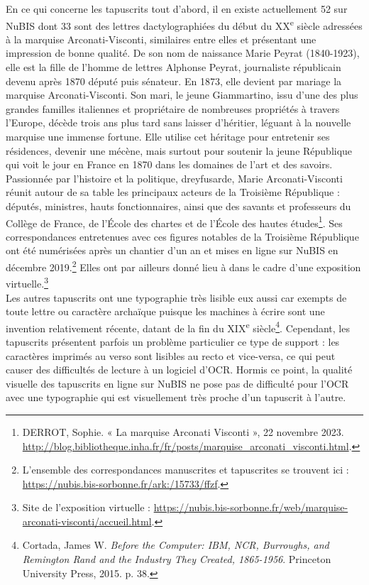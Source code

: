 \documentclass[a4paper,12pt,twoside]{book}
\begin{document}
En ce qui concerne les tapuscrits tout d'abord, il en existe
actuellement 52 sur NuBIS dont 33 sont des lettres dactylographiées du
début du XX\textsuperscript{e} siècle adressées à la marquise
Arconati-Visconti, similaires entre elles et présentant une impression
de bonne qualité. De son nom de naissance Marie Peyrat (1840-1923), elle
est la fille de l'homme de lettres Alphonse Peyrat, journaliste
républicain devenu après 1870 député puis sénateur. En 1873, elle
devient par mariage la marquise Arconati-Visconti. Son mari, le jeune
Giammartino, issu d'une des plus grandes familles
italiennes et propriétaire de nombreuses propriétés à travers
l'Europe, décède trois ans plus tard sans laisser
d'héritier, léguant à la nouvelle marquise une immense
fortune. Elle utilise cet héritage pour entretenir ses résidences,
devenir une mécène, mais surtout pour soutenir la jeune République qui
voit le jour en France en 1870 dans les domaines de
l'art et des savoirs. Passionnée par
l'histoire et la politique, dreyfusarde, Marie
Arconati-Visconti réunit autour de sa table les principaux acteurs de la
Troisième République : députés, ministres, hauts fonctionnaires, ainsi
que des savants et professeurs du Collège de France, de
l'École des chartes et de l'École des
hautes études\footnote{DERROT, Sophie. « La marquise Arconati Visconti
	», 22 novembre 2023.
	\url{http://blog.bibliotheque.inha.fr/fr/posts/marquise_arconati_visconti.html}.}.
Ses correspondances entretenues avec ces figures notables de la
Troisième République ont été numérisées après un chantier d'un an et
mises en ligne sur NuBIS en décembre 2019.\footnote{L'ensemble des
	correspondances manuscrites et tapuscrites se trouvent ici :
	\url{https://nubis.bis-sorbonne.fr/ark:/15733/ffzf}.}
Elles ont par ailleurs donné lieu à dans le cadre d'une exposition
virtuelle.\footnote{Site de l'exposition virtuelle :
	\url{https://nubis.bis-sorbonne.fr/web/marquise-arconati-visconti/accueil.html}.} \\

Les autres tapuscrits ont une typographie très lisible eux aussi car
exempts de toute lettre ou caractère archaïque puisque les machines à
écrire sont une invention relativement récente, datant de la fin du
XIX\textsuperscript{e} siècle\footnote{Cortada, James W. \emph{Before
		the Computer: IBM, NCR, Burroughs, and Remington Rand and the Industry
		They Created, 1865-1956}. Princeton University Press, 2015. p. 38.}.
Cependant, les tapuscrits présentent parfois un problème particulier ce
type de support : les caractères imprimés au verso sont lisibles au
recto et vice-versa, ce qui peut causer des difficultés de lecture à un
logiciel d'OCR. Hormis ce point, la qualité visuelle des tapuscrits en
ligne sur NuBIS ne pose pas de difficulté pour l'OCR avec une
typographie qui est visuellement très proche d'un tapuscrit à l'autre. \\
\end{document}
